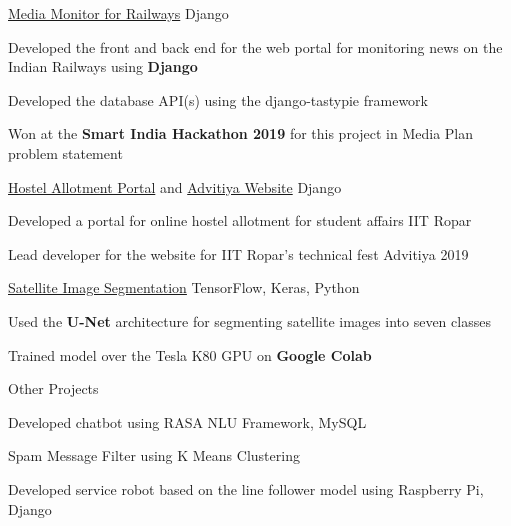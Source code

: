 \begin{cventries}
  \projects
  {} %
  {\href{https://github.com/abhineet99/News-sentiment-SIH19}{Media Monitor for Railways}} %
  {Django} %
  {} %
  {
    \begin{cvitems} %
      \item {Developed the front and back end for the web portal for monitoring news on the Indian Railways using \textbf{Django}}
      \item {Developed the database API(s) using the django-tastypie framework}
      \item {Won at the \textbf{Smart India Hackathon 2019} for this project in Media Plan problem statement}
    \end{cvitems}
  }

  \projects
    {} %
    {\href{https://github.com/vinx-2105/hostel-allotment-portal}{Hostel Allotment Portal} and \href{https://github.com/software-community/Advitiya-18}{Advitiya Website}} %
    {Django} %
    {} %
    {
      \begin{cvitems} %
        \item {Developed a portal for online hostel allotment for student affairs IIT Ropar}
        \item {Lead developer for the website for IIT Ropar's technical fest Advitiya 2019}
      \end{cvitems}
    }

  \projects
    {} %
    {\href{https://github.com/Nilanshrajput/interiit_techmeet}{Satellite Image Segmentation}} %
    {TensorFlow, Keras, Python} %
    {} %
    {
      \begin{cvitems} %
        \item {Used the \textbf{U-Net} architecture for segmenting satellite images into seven classes}
        \item {Trained model over the Tesla K80 GPU on \textbf{Google Colab}}
      \end{cvitems}
    }

    \projects
    {} %
    {{Other Projects}} %
    {} %
    {} %
    {
      \begin{cvitems} %
        \item {Developed chatbot using RASA NLU Framework, MySQL}
        \item {Spam Message Filter using K Means Clustering}
        \item {Developed service robot based on the line follower model using Raspberry Pi, Django}
      \end{cvitems}
    }





\end{cventries}
